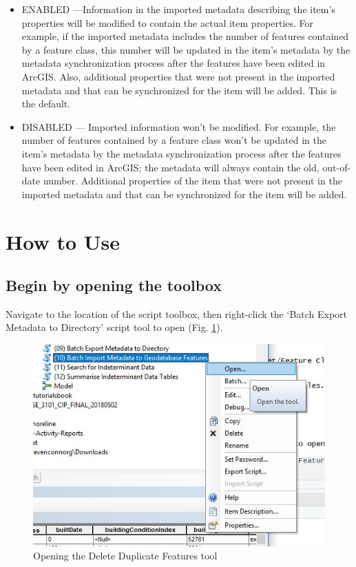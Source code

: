 \documentclass[openany]{book}
\providecommand{\tightlist}{%
  \setlength{\itemsep}{0pt}\setlength{\parskip}{0pt}}
\theoremstyle{definition}
\theoremstyle{definition}
\theoremstyle{definition}
\theoremstyle{remark}
\begin{document}
\begin{enumerate}
  \begin{itemize}
  \tightlist
  \item
    ENABLED ---Information in the imported metadata describing the
    item's properties will be modified to contain the actual item
    properties. For example, if the imported metadata includes the
    number of features contained by a feature class, this number will be
    updated in the item's metadata by the metadata synchronization
    process after the features have been edited in ArcGIS. Also,
    additional properties that were not present in the imported metadata
    and that can be synchronized for the item will be added. This is the
    default.
  \item
    DISABLED --- Imported information won't be modified. For example,
    the number of features contained by a feature class won't be updated
    in the item's metadata by the metadata synchronization process after
    the features have been edited in ArcGIS; the metadata will always
    contain the old, out-of-date number. Additional properties of the
    item that were not present in the imported metadata and that can be
    synchronized for the item will be added.
  \end{itemize}
\end{enumerate}

\section{How to Use}\label{how-to-use-11}

\subsection{Begin by opening the
toolbox}\label{begin-by-opening-the-toolbox-11}

Navigate to the location of the script toolbox, then right-click the
`Batch Export Metadata to Directory' script tool to open (Fig.
\ref{fig:imMetaopen}).

\begin{figure}[H]

{\centering \includegraphics{figures/imMeta-open} 

}

\caption{Opening the Delete Duplicate Features tool}\label{fig:imMetaopen}
\end{figure}
\end{document}
